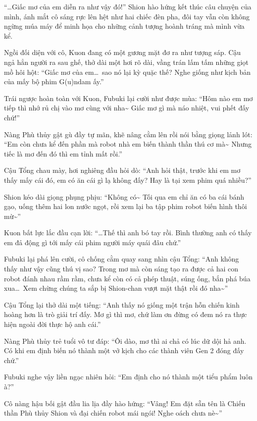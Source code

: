 \documentclass[../main.tex]{subfiles}
\begin{document}
\ct

``\dots Giấc mơ của em diễn ra như vậy đó!'' Shion hào hứng kết thúc câu chuyện của mình, ánh mắt cô sáng rực lên hệt như hai chiếc đèn pha, đôi tay vẫn còn không ngừng múa máy để minh họa cho những cảnh tượng hoành tráng mà mình vừa kể.

Ngồi đối diện với cô,  Kuon đang có một gương mặt đơ ra như tượng sáp. Cậu ngả hẳn người ra sau ghế, thở dài một hơi rõ dài, vầng trán lấm tấm những giọt mồ hôi hột: ``Giấc mơ của em\dots\ sao nó lại kỳ quặc thế? Nghe giống như kịch bản của mấy bộ phim G(u)ndam ấy.''

Trái ngược hoàn toàn với Kuon, Fubuki lại cười như được mùa: ``Hôm nào em mơ tiếp thì nhớ rủ chị vào mơ cùng với nha\~{} Giấc mơ gì mà náo nhiệt, vui phết đấy chứ!''

Nàng Phù thủy gật gù đầy tự mãn, khẽ nâng cằm lên rồi nói bằng giọng lảnh lót: ``Em còn chưa kể đến phần mà robot nhà em biến thành thần thú cơ mà\~{} Nhưng tiếc là mơ đến đó thì em tỉnh mất rồi.''

Cậu Tổng chau mày, hơi nghiêng đầu hỏi dò: ``Anh hỏi thật, trước khi em mơ thấy mấy cái đó, em có ăn cái gì lạ không đấy? Hay là tại xem phim quá nhiều?''

Shion kéo dài giọng phụng phịu: ``Không có\~{} Tối qua em chỉ ăn có ba cái bánh gạo, uống thêm hai lon nước ngọt, rồi xem lại ba tập phim robot biến hình thôi mừ\~{}''

Kuon bất lực lắc đầu cạn lời: ``\dots Thế thì anh bó tay rồi. Bình thường anh có thấy em đả động gì tới mấy cái phim người máy quái đâu chứ.''

Fubuki lại phá lên cười, cô chống cằm quay sang nhìn cậu Tổng: ``Anh không thấy như vậy cũng thú vị sao? Trong mơ mà còn sáng tạo ra được cả hai con robot đánh nhau rầm rầm, chưa kể còn có cả phép thuật, súng ống, bắn phá búa xua\dots\ Xem chừng chúng ta sắp bị Shion-chan vượt mặt thật rồi đó nha\~{}''

Cậu Tổng lại thở dài một tiếng: ``Anh thấy nó giống một trận hỗn chiến kinh hoàng hơn là trò giải trí đấy. Mơ gì thì mơ, chứ làm ơn đừng có đem nó ra thực hiện ngoài đời thực hộ anh cái.''

Nàng Phù thủy trẻ tuổi vô tư đáp: ``Ôi dào, mơ thì ai chả có lúc dữ dội hả anh. Có khi em định biến nó thành một vở kịch cho các thành viên Gen 2 đóng đấy chứ.''

Fubuki nghe vậy liền ngạc nhiên hỏi: ``Em định cho nó thành một tiểu phẩm luôn à?''

Cô nàng hậu bối gật đầu lia lịa đầy hào hứng: ``Vâng! Em đặt sẵn tên là Chiến thần Phù thủy Shion và đại chiến robot mái ngói! Nghe oách chưa nè\~{}''
\end{document}
